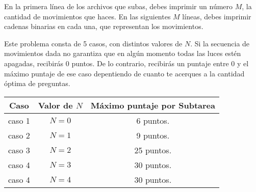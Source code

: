 \documentclass[12pt]{scrartcl}
\begin{document}

    En la primera línea de los archivos que subas, debes imprimir un número $M$, la cantidad de movimientos que haces. 
    En las siguientes $M$ líneas, debes imprimir cadenas binarias en cada una, que representan los movimientos.

    \newpage
    
    
    Este problema consta de 5 casos, con distintos valores de $N$. Si la secuencia de movimientos dada no garantiza que en algún momento todas las luces estén apagadas, recibirás 0 puntos. De lo contrario, recibirás un puntaje entre 0 y el máximo puntaje de ese caso depentiendo de cuanto te acerques a la cantidad óptima de preguntas. 
    

    \begin{center}
        \begin{tabular}{|c|c|c|}
            \hline
            Caso & Valor de $N$ & Máximo puntaje por Subtarea \\
            \hline
             caso 1 & $N = 0$ & 6 puntos.  \\
            \hline
             caso 2 & $N = 1$ & 9 puntos.  \\
            \hline
            caso 3 & $N = 2$ & 25 puntos. \\
            \hline
            caso 4 & $N = 3$ & 30 puntos. \\
            \hline
            caso 4 & $N = 4$ & 30 puntos. \\
            \hline
        \end{tabular}
    \end{center}
    
        

    
    
\end{document}
